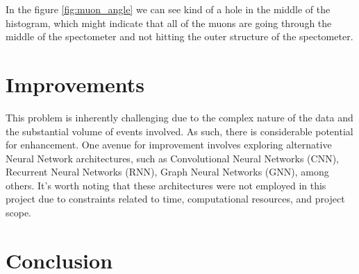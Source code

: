\documentclass{article}
\begin{document}
In the figure \ref{fig:muon_angle} we can see kind of a hole in the middle of the histogram, which might indicate that all of the muons are going through the middle of the spectometer and not hitting the outer structure of the spectometer.



\section{Improvements}
This problem is inherently challenging due to the complex nature of the data and the substantial volume of events involved. As such, there is considerable potential for enhancement. One avenue for improvement involves exploring alternative Neural Network architectures, such as Convolutional Neural Networks (CNN), Recurrent Neural Networks (RNN), Graph Neural Networks (GNN), among others. It's worth noting that these architectures were not employed in this project due to constraints related to time, computational resources, and project scope.


\section{Conclusion}
\end{document}
